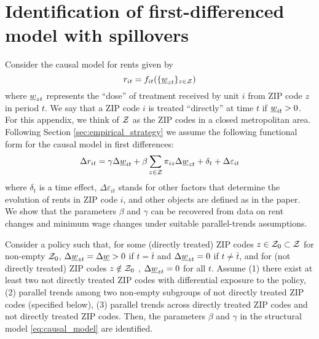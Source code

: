 \clearpage
\section{Identification of first-differenced model with spillovers}\label{sec:did_spillovers_id}

Consider the causal model for rents given by
$$r_{it}=f_{it}(\{\underline{w}_{zt}\}_{z\in\mathcal{Z}})$$
where $\underline{w}_{zt}$ represents the ``dose'' of treatment received by unit $i$ from
ZIP code $z$ in period $t$.
We say that a ZIP code $i$ is treated ``directly'' at time $t$ if $\underline{w}_{it}>0$.
For this appendix, we think of $\mathcal{Z}$ as the ZIP codes in a closed metropolitan 
area. 
Following Section \ref{sec:empirical_strategy} we assume the following functional
form for the causal model in first differences:
\begin{equation}\label{eq:causal_model}
    \Delta r_{it} = \gamma \Delta \underline{w}_{it} 
                  + \beta \sum_{z\in\mathcal{Z}} \pi_{iz} \Delta \underline{w}_{zt}
                  + \delta_t + \Delta \varepsilon_{it}
\end{equation}
where $\delta_t$ is a time effect,
$\Delta \varepsilon_{it}$ stands for other factors that determine the evolution
of rents in ZIP code $i$, and
other objects are defined as in the paper.
We show that the parameters $\beta$ and $\gamma$ can be recovered from data on 
rent changes and minimum wage changes under suitable parallel-trends 
assumptions.

\begin{prop}[Identification]\label{prop:did_id}
    Consider a policy such that, 
    for some (directly treated) ZIP codes  $z\in\mathcal{Z}_0\subset\mathcal{Z}$ for non-empty $\mathcal{Z}_0$,
        $\Delta\underline{w}_{zt}=\Delta\underline{w}>0$ if $t=\bar{t}$ and
        $\Delta\underline{w}_{zt}=0$           if $t\neq\bar{t}$,
    and for (not directly treated) ZIP codes $z\notin\mathcal{Z}_0$ ,
        $\Delta\underline{w}_{zt}=0$ for all $t$.
    Assume
    (1) there exist at least two not directly treated ZIP codes with differential 
    exposure to the policy, 
    (2) parallel trends among two non-empty subgroups of not directly treated 
    ZIP codes (specified below),
    (3) parallel trends across directly treated ZIP codes and not directly 
    treated ZIP codes.
    Then, the parameters $\beta$ and $\gamma$ in the structural model 
    \ref{eq:causal_model} are identified.
\end{prop}

